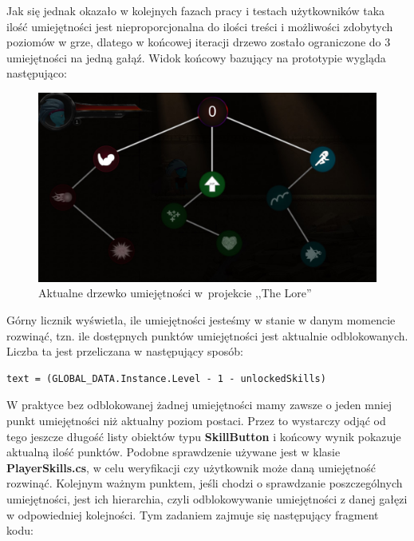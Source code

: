 \documentclass[oneside,polski,logo]{amuthesis}
\begin{document}
Jak się jednak okazało w kolejnych fazach pracy i testach użytkowników taka ilość umiejętności jest nieproporcjonalna do ilości treści i możliwości zdobytych poziomów w grze, dlatego w końcowej iteracji drzewo zostało ograniczone do 3 umiejętności na jedną gałąź. Widok końcowy bazujący na prototypie wygląda następująco:


\begin{figure}[h]
	\centering
	\includegraphics[width=13cm]{images/kozubal/drzewkoTheLore.jpg}
	\caption{Aktualne drzewko umiejętności w~projekcie ,,The Lore''}
\end{figure}
\newpage
Górny licznik wyświetla, ile umiejętności jesteśmy w stanie w danym momencie rozwinąć, tzn. ile dostępnych punktów umiejętności jest aktualnie odblokowanych. Liczba ta jest przeliczana w następujący sposób:


\begin{lstlisting}[breaklines=true,
language={[Sharp]C},
rulecolor=\color{blue!80!black},
caption={Fragment klasy \texttt{UI\_SkillTree.cs}}
]    
text = (GLOBAL_DATA.Instance.Level - 1 - unlockedSkills)
\end{lstlisting}

W praktyce bez odblokowanej żadnej umiejętności mamy zawsze o jeden mniej punkt umiejętności niż aktualny poziom postaci. Przez to wystarczy odjąć od tego jeszcze długość listy obiektów typu \textbf{SkillButton} i końcowy wynik pokazuje aktualną ilość punktów. Podobne sprawdzenie używane jest w klasie \textbf{PlayerSkills.cs}, w celu weryfikacji czy użytkownik może daną umiejętność rozwinąć. Kolejnym ważnym punktem, jeśli chodzi o sprawdzanie poszczególnych umiejętności, jest ich hierarchia, czyli odblokowywanie umiejętności z danej gałęzi w odpowiedniej kolejności. Tym zadaniem zajmuje się następujący fragment kodu:
\end{document}
